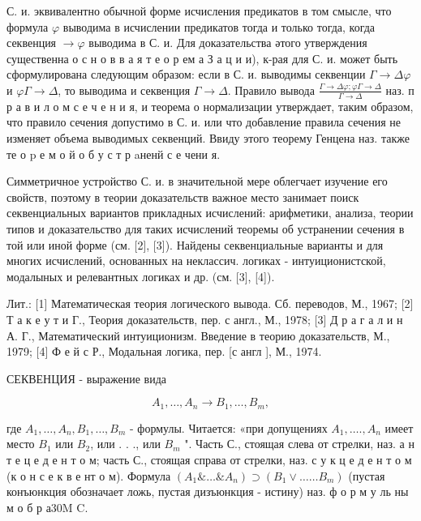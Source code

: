 \documentclass[10pt]{article}
\begin{document}
С. и. эквивалентно обычной форме исчисления предикатов в том смысле, что формула $\varphi$ выводима в исчислении предикатов тогда и только тогда, когда секвенция $\rightarrow \varphi$ выводима в С. и. Для доказательства әтого утверждения существенна о с н о в в а я т е о р ем а З а ц и и), к-рая для С. и. может быть сформулирована следующим образом: если в С. и. выводимы секвенции $\Gamma \rightarrow \Delta \varphi$ и $\varphi \Gamma \rightarrow \Delta$, то выводима и секвенция $\Gamma \rightarrow \Delta$. Правило вывода $\frac{\Gamma \rightarrow \Delta \varphi ; \varphi \Gamma \rightarrow \Delta}{\Gamma \rightarrow \Delta}$ наз. п р а в и л о м с е ч е н и я, и теорема о нормализации утверждает, таким образом, что правило сечения допустимо в С. и. или что добавление правила сечения не изменяет объема выводимых секвенций. Ввиду этого теорему Генцена наз. также те $о$ p е м о й о б у с т р aненй с е чени я.



Симметричное устройство С. и. в значительной мере облегчает изучение его свойств, поэтому в теории доказательств важное место занимает поиск секвенциальных вариантов прикладных исчислений: арифметики, анализа, теории типов и доказательство для таких исчислений теоремы об устранении сечения в той или иной форме (см. [2], [3]). Найдены секвенциальные варианты и для многих исчислений, основанных на неклассич. логиках - интуиционистской, модалыных и релевантных логиках и др. (см. [3], [4]).



Лит.: [1] Математическая теория логического вывода. Сб. переводов, М., 1967; [2] Т а к е у т и Г., Теория доказательств, пер. с англ., М., 1978; [3] Д р а г а л и н А. Г., Математический интуиционизм. Введение в теорию доказательств, М., 1979; [4] Ф е й с Р., Модальная логика, пер. [с англ ], М., 1974.



СЕКВЕНЦИЯ - выражение вида



\[

A_{1}, \ldots, A_{n} \rightarrow B_{1}, \ldots, B_{m},

\]



где $A_{1}, \ldots, A_{n}, B_{1}, \ldots, B_{m}$ - формулы. Читается: «при допущениях $A_{1}, \ldots ., A_{n}$ имеет место $B_{1}$ или $B_{2}$, или . . ., или $B_{m}$ ". Часть С., стоящая слева от стрелки, наз. а н т е ц е д е н т о м; часть С., стоящая справа от стрелки, наз. с у к ц е д е н т о м (к о н с е к в е нт о м). Формула $\left(A_{1} \& \ldots \& A_{n}\right) \supset\left(B_{1} \vee \ldots \ldots B_{m}\right)$ (пустая конъюнкция обозначает ложь, пустая дизъюнкция - истину) наз. ф о р м у ль ны м о б р а$30 \mathrm{M}$ C.
\end{document}
